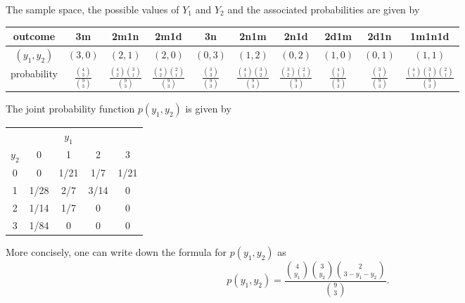 \begin{solution}
	The sample space, the possible values of $Y_1$ and $Y_2$ and the associated probabilities are given by
	\begin{center}
		\begin{tabular}{|c|c| c| c| c| c| c| c| c|c|}
			\hline
			 outcome & 3m & 2m1n & 2m1d & 3n & 2n1m & 2n1d & 2d1m & 2d1n & 1m1n1d \\ \hline
			 $(y_1, y_2)$ & $(3,0)$ & $(2,1)$ & $(2,0)$ & $(0,3)$ & $(1,2)$ & $(0,2)$ & $(1,0)$ & $(0,1)$ & $(1,1)$ \\ \hline
			 probability & $\frac{{4\choose 3}}{{9\choose 3}}$ & $\frac{{4\choose 2}{3\choose 1}}{{9\choose 3}}$ & $\frac{{4\choose 2}{2\choose 1}}{{9\choose 3}}$ & $\frac{{3\choose 3}}{{9\choose 3}}$ & $\frac{{4\choose 1}{3\choose 2}}{{9\choose 3}}$ & $\frac{{3\choose 2}{2\choose 1}}{{9\choose 3}}$ & $\frac{{4\choose 1}}{{9\choose 3}}$ & $\frac{{3\choose 1}}{{9\choose 3}}$ &  $\frac{{4\choose 1}{3\choose 1}{2\choose 1}}{{9\choose 3}}$ \\ \hline
		\end{tabular}
	\end{center}
	The joint probability function $p(y_1, y_2)$ is given by
	\begin{center}
		\begin{tabular}{c| c c c c }
			& & $y_1$ & & \\ \cline{2-5}
			$y_2$ & 0 & 1 & 2 & 3 \\ \hline
			0 & 0 & 1/21 & 1/7 & 1/21\\
			1 & 1/28 & 2/7 & 3/14 & 0\\
			2 & 1/14 & 1/7 & 0 & 0\\
			3 & 1/84 & 0 & 0 &  0\\
		\end{tabular}
	\end{center}
	More concisely, one can write down the formula for $p(y_1,y_2)$ as
	\[p(y_1, y_2) = \frac{{4\choose y_1}{3\choose y_2}{2\choose 3-y_1-y_2}}{{9\choose 3}}.\]
\end{solution}